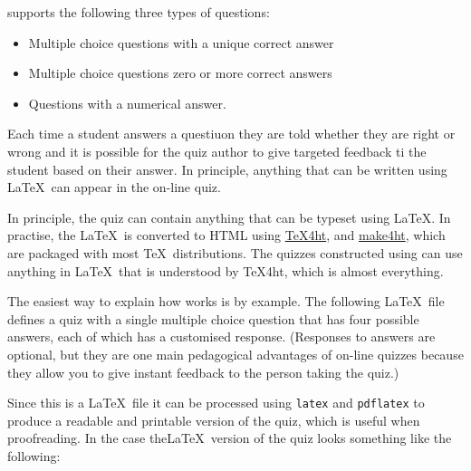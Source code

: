 \documentclass[svgnames]{article}
\begin{document}
    \MathQuiz supports the following three types of questions:
    \begin{itemize}
      \item Multiple choice questions with a unique correct answer
      \item Multiple choice questions zero or more correct answers
      \item Questions with a numerical answer.
    \end{itemize}
    Each time a student answers a questiuon they are told whether they
    are right or wrong and it is possible for the quiz author to give
    targeted feedback ti the student based on their answer. In
    principle, anything that can be written using \LaTeX\ can appear in
    the on-line quiz.

    In principle, the quiz can contain anything that can be typeset
    using \LaTeX.  In practise, the \LaTeX\ is converted to HTML using
    \href{https://www.tug.org/applications/tex4ht/mn.html}{\TeX 4ht},
    and \href{https://github.com/michal-h21/make4ht}{make4ht}, which are
    packaged with most \TeX\ distributions. The quizzes constructed
    using \MathQuiz can use anything in \LaTeX\ that is understood by
    \TeX 4ht, which is almost everything.

    The easiest way to explain how \MathQuiz works is by example. The
    following \LaTeX\ file defines a quiz with a single multiple choice
    question that has four possible answers, each of which has a
    customised response.  (Responses to answers are optional, but they
    are one main pedagogical advantages of on-line quizzes because they
    allow you to give instant feedback to the person taking the quiz.)

    

    Since this is a \LaTeX\ file it can be processed using
    \texttt{latex} and \texttt{pdflatex} to produce a readable and
    printable version of the quiz, which is useful when proofreading. In
    the case the\LaTeX\ version of the quiz looks something like the
    following:

    \begin{center}
    \end{center}
\end{document}
